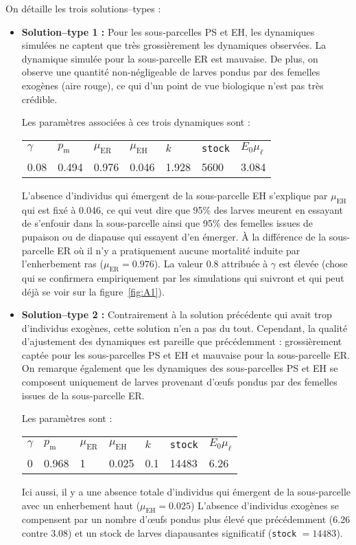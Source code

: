On détaille les trois solutions--types :
\begin{itemize}
 \item \textbf{Solution--type 1 :} 
 Pour les sous-parcelles PS et EH, les dynamiques simulées ne captent que très grossièrement les dynamiques observées.
 La dynamique simulée pour la sous-parcelle ER est mauvaise.
 De plus, on observe une quantité non-négligeable de larves pondus par des femelles exogènes (aire rouge), ce qui d'un point de vue biologique n'est pas très crédible.
 
 Les paramètres associées à ces trois dynamiques sont :
 \begin{center}
\begin{tabular}{lllllll}
$\gamma$ & $p_{\text{m}}$ & $\mu_{\text{ER}}$ & $\mu_{\text{EH}}$ & $k$ & \texttt{stock} & $E_0\mu_{\ell}$\\
0.08 & 0.494 & 0.976 & 0.046 & 1.928 & 5600 & 3.084
 \end{tabular}
 \end{center}
L'absence d'individus qui émergent de la sous-parcelle EH s'explique par $\mu_{\text{EH}}$ qui est fixé à 0.046, ce qui veut dire que 95\% des larves meurent en essayant de s'enfouir dans la sous-parcelle ainsi que 95\% des femelles issues de pupaison ou de diapause qui essayent d'en émerger.
À la différence de la sous-parcelle ER où il n'y a pratiquement aucune mortalité induite par l'enherbement ras ($\mu_{\text{ER}} = 0.976$).
La valeur 0.8 attribuée à $\gamma$ est élevée (chose qui se confirmera empiriquement par les simulations qui suivront et qui peut déjà se voir sur la figure~\ref{fig:A1}).

\item \textbf{Solution--type 2 :} Contrairement à la solution précédente qui avait trop d'individus exogènes, cette solution n'en a pas du tout.
Cependant, la qualité d'ajustement des dynamiques est pareille que précédemment : grossièrement captée pour les sous-parcelles PS et EH et mauvaise pour la sous-parcelle ER.
On remarque également que les dynamiques des sous-parcelles PS et EH se composent uniquement de larves provenant d'œufs pondus par des femelles issues de la sous-parcelle ER.

Les paramètres sont :
 \begin{center}
\begin{tabular}{lllllll}
$\gamma$ & $p_{\text{m}}$ & $\mu_{\text{ER}}$ & $\mu_{\text{EH}}$ & $k$ & \texttt{stock} & $E_0\mu_{\ell}$\\
0 & 0.968 & 1 & 0.025 & 0.1 & 14483 & 6.26
 \end{tabular}
 \end{center}
 Ici aussi, il y a une absence totale d'individus qui émergent de la sous-parcelle avec un enherbement haut ($\mu_{\text{EH}} = 0.025$)
 L'absence d'individus exogènes se compensent par un nombre d'œufs pondus plus élevé que précédemment (6.26 contre 3.08) et un stock de larves diapausantes significatif (\texttt{stock} $=14483$).
 

\end{itemize}
